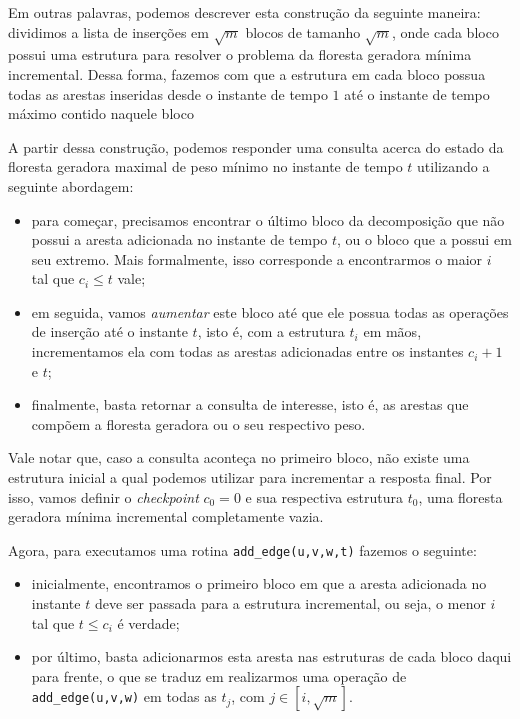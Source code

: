 Em outras palavras, podemos descrever esta construção da seguinte maneira: dividimos a lista de inserções em $\sqrt m$ blocos de tamanho $\sqrt m$, onde cada bloco possui uma estrutura para resolver o problema da floresta geradora mínima incremental. Dessa forma, fazemos com que a estrutura em cada bloco possua todas as arestas inseridas desde o instante de tempo $1$ até o instante de tempo máximo contido naquele bloco


A partir dessa construção, podemos responder uma consulta acerca do estado da floresta geradora maximal de peso mínimo no instante de tempo $t$ utilizando a seguinte abordagem:

\begin{itemize}
    \item para começar, precisamos encontrar o último bloco da decomposição que não possui a aresta adicionada no instante de tempo $t$, ou o bloco que a possui em seu extremo. Mais formalmente, isso corresponde a encontrarmos o maior $i$ tal que $c_i \leq t$ vale;
    \item em seguida, vamos \emph{aumentar} este bloco até que ele possua todas as operações de inserção até o instante $t$, isto é, com a estrutura $t_i$ em mãos, incrementamos ela com todas as arestas adicionadas entre os instantes $c_i + 1$ e $t$;
    \item finalmente, basta retornar a consulta de interesse, isto é, as arestas que compõem a floresta geradora ou o seu respectivo peso.
\end{itemize}

Vale notar que, caso a consulta aconteça no primeiro bloco, não existe uma estrutura inicial a qual podemos utilizar para incrementar a resposta final. Por isso, vamos definir o \emph{checkpoint} $c_0 = 0$ e sua respectiva estrutura $t_0$, uma floresta geradora mínima incremental completamente vazia.

Agora, para executamos uma rotina \texttt{add\_edge(u,v,w,t)} fazemos o seguinte:

\begin{itemize}
    \item inicialmente, encontramos o primeiro bloco em que a aresta adicionada no instante $t$ deve ser passada para a estrutura incremental, ou seja, o menor $i$ tal que $t \leq c_i$ é verdade;
    \item por último, basta adicionarmos esta aresta nas estruturas de cada bloco daqui para frente, o que se traduz em realizarmos uma operação de \texttt{add\_edge(u,v,w)} em todas as $t_j$, com $j \in [i, \sqrt m]$.
\end{itemize}

